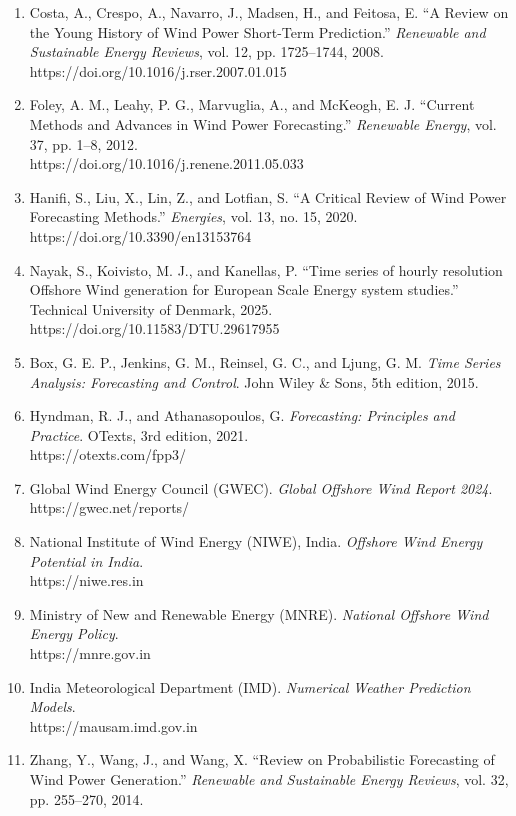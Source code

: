 \documentclass[12pt,a4paper]{article}
\begin{document}
\begin{enumerate}

\item Costa, A., Crespo, A., Navarro, J., Madsen, H., and Feitosa, E.  
``A Review on the Young History of Wind Power Short-Term Prediction.''  
\textit{Renewable and Sustainable Energy Reviews}, vol. 12, pp. 1725–1744, 2008.\\
https://doi.org/10.1016/j.rser.2007.01.015

\item Foley, A. M., Leahy, P. G., Marvuglia, A., and McKeogh, E. J.  
``Current Methods and Advances in Wind Power Forecasting.''  
\textit{Renewable Energy}, vol. 37, pp. 1–8, 2012.\\
https://doi.org/10.1016/j.renene.2011.05.033

\item Hanifi, S., Liu, X., Lin, Z., and Lotfian, S.  
``A Critical Review of Wind Power Forecasting Methods.''  
\textit{Energies}, vol. 13, no. 15, 2020.\\
https://doi.org/10.3390/en13153764

\item Nayak, S., Koivisto, M. J., and Kanellas, P.  
``Time series of hourly resolution Offshore Wind generation for European Scale Energy system studies.''  
Technical University of Denmark, 2025.\\
https://doi.org/10.11583/DTU.29617955

\item Box, G. E. P., Jenkins, G. M., Reinsel, G. C., and Ljung, G. M.  
\textit{Time Series Analysis: Forecasting and Control}.  
John Wiley \& Sons, 5th edition, 2015.

\item Hyndman, R. J., and Athanasopoulos, G.  
\textit{Forecasting: Principles and Practice}.  
OTexts, 3rd edition, 2021.\\
https://otexts.com/fpp3/

\item Global Wind Energy Council (GWEC).  
\textit{Global Offshore Wind Report 2024}.\\
https://gwec.net/reports/

\item National Institute of Wind Energy (NIWE), India.  
\textit{Offshore Wind Energy Potential in India}.\\
https://niwe.res.in

\item Ministry of New and Renewable Energy (MNRE).  
\textit{National Offshore Wind Energy Policy}.\\
https://mnre.gov.in

\item India Meteorological Department (IMD).  
\textit{Numerical Weather Prediction Models}.\\
https://mausam.imd.gov.in

\item Zhang, Y., Wang, J., and Wang, X.  
``Review on Probabilistic Forecasting of Wind Power Generation.''  
\textit{Renewable and Sustainable Energy Reviews}, vol. 32, pp. 255–270, 2014.

\end{enumerate}
\end{document}
